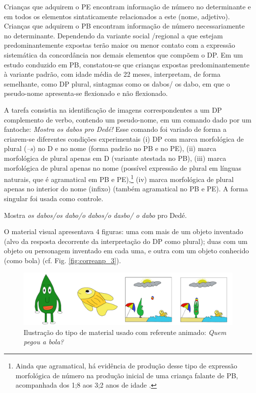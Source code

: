\documentclass[output=paper]{LSP/langsci}
\begin{document}
Crianças que adquirem o PE encontram informação de número no determinante e em todos os elementos sintaticamente relacionados a este (nome, adjetivo). Crianças que adquirem o PB encontram informação de número necessariamente no determinante. Dependendo da variante social /regional a que estejam predominantemente expostas terão maior ou menor contato com a expressão sistemática da concordância nos demais elementos que compõem o DP. Em um estudo conduzido em PB, constatou-se que crianças expostas predominantemente à variante padrão, com idade média de 22 meses, interpretam, de forma semelhante, como DP plural, sintagmas como os dabos/ os dabo, em que o pseudo-nome apresenta-se flexionado e não flexionado.

A tarefa consistia na identificação de imagens correspondentes a um DP complemento de verbo, contendo um pseudo-nome, em um comando dado por um fantoche: \textit{Mostra os dabos pro Dedé!}  Esse comando foi variado de forma a criarem-se diferentes condições experimentais (i) DP com marca morfológica de plural (\textit{–s}) no D e no nome (forma padrão no PB e no PE), (ii) marca morfológica de plural apenas em D (variante atestada no PB), (iii) marca morfológica de plural apenas no nome (possível expressão de plural em línguas naturais, que é agramatical em PB e PE),\footnote{Ainda que agramatical, há evidência de produção desse tipo de expressão morfológica de número na produção inicial de uma criança falante de PB, acompanhada dos 1;8 aos 3;2 anos de idade \citep{lopes2004,simioni2006}.} (iv) marca morfológica de plural apenas no interior do nome (infixo) (também agramatical no PB e PE). A forma singular foi usada como controle.

\ea\label{ex:correanp_19} Mostra \textit{os dabos/os dabo/o dabos/o dasbo/ o dabo} pro Dedé.
\z

O material visual apresentava 4 figuras: uma com mais de um objeto inventado (alvo da resposta decorrente da interpretação do DP como plural); duas com um objeto ou personagem inventado em cada uma, e outra com um objeto conhecido (como bola) (cf. Fig. \ref{fig:correanp_3}).

\begin{figure}
\includegraphics[width=\textwidth]{figures/correanp2.pdf}
\caption{Ilustração do tipo de material usado com referente animado: \textit{Quem pegou a bola?}}
\label{fig:correanp_2}
\end{figure}
\end{document}
